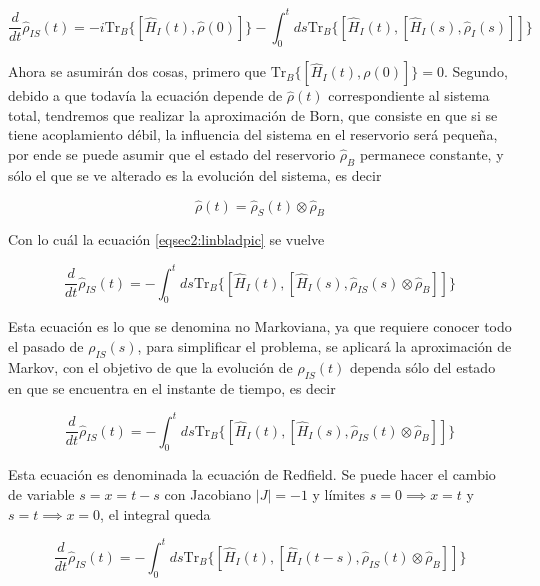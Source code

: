 \begin{equation}
    \frac{d}{dt}\hat{\rho}_{IS}(t) = -i \text{Tr}_{B}\{[\hat{H}_{I}(t),\hat{\rho}(0)] \}  -  \int_{0}^{t}ds \text{Tr}_{B}\{[\hat{H}_{I}(t), [\hat{H}_{I}(s),\hat{\rho}_{I}(s)]]\}
\end{equation}

Ahora se asumirán dos cosas, primero que $\text{Tr}_{B}\{[\hat{H}_{I}(t),\rho(0)] \} = 0$. Segundo, debido a que todavía la ecuación depende de $\hat{\rho}(t)$ correspondiente al sistema total, tendremos que realizar la aproximación de Born, que consiste en que si se tiene acoplamiento débil, la influencia del sistema en el reservorio será pequeña, por ende se puede asumir que el estado del reservorio $\hat{\rho}_{B}$ permanece constante, y sólo el que se ve alterado es la evolución del sistema, es decir

\begin{equation*}
    \hat{\rho}(t) = \hat{\rho}_{S}(t)\otimes \hat{\rho}_{B}
\end{equation*}

Con lo cuál la ecuación \ref{eqsec2:linbladpic} se vuelve

\begin{equation}
    \frac{d}{dt}\hat{\rho}_{IS}(t) = -  \int_{0}^{t}ds \text{Tr}_{B}\{[\hat{H}_{I}(t), [\hat{H}_{I}(s),\hat{\rho}_{IS}(s) \otimes \hat{\rho}_{B}]]\}
\end{equation} 

Esta ecuación es lo que se denomina no Markoviana, ya que requiere conocer todo el pasado de $\rho_{IS}(s)$, para simplificar el problema, se aplicará la aproximación de Markov, con el objetivo de que la evolución de $\hat{\rho}_{IS}(t)$ dependa sólo del estado en que se encuentra en el instante de tiempo, es decir

\begin{equation*}
    \frac{d}{dt}\hat{\rho}_{IS}(t) = -  \int_{0}^{t}ds \text{Tr}_{B}\{[\hat{H}_{I}(t), [\hat{H}_{I}(s),\hat{\rho}_{IS}(t) \otimes \hat{\rho}_{B}]]\}
\end{equation*} 

Esta ecuación es denominada la ecuación de Redfield. Se puede hacer el cambio de variable $s= x = t-s$ con Jacobiano $|J| = -1$ y límites $s=0 \implies x = t$ y $s=t \implies x = 0$, el integral queda

\begin{equation}
    \frac{d}{dt}\hat{\rho}_{IS}(t) = -  \int_{0}^{t}ds \text{Tr}_{B}\{[\hat{H}_{I}(t), [\hat{H}_{I}(t-s),\hat{\rho}_{IS}(t) \otimes \hat{\rho}_{B}]]\}
    \label{eq3sec2:markov}
\end{equation} 

